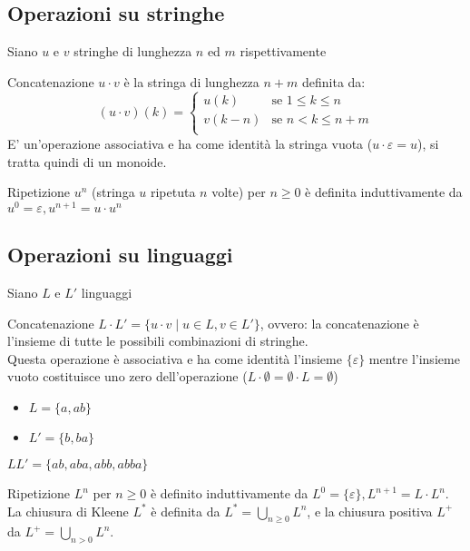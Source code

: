 \documentclass[12pt, a4paper]{report}
\newenvironment{example}[1][]{\begin{tcolorbox}[example, #1]}{\end{tcolorbox}}
\begin{document}
    \subsection{Operazioni su stringhe}
        Siano $u$ e $v$ stringhe di lunghezza $n$ ed $m$ rispettivamente
        \begin{definitionbox}{Concatenazione}{}
            $u\cdot v$ è la stringa di lunghezza $n+m$ definita da:
            $$
                (u\cdot v)(k)=\begin{cases}
                    u(k) & \text{se } 1\leq k\leq n\\
                    v(k-n) & \text{se } n<k\leq n+m\\
                \end{cases}
            $$
            E' un'operazione associativa e ha come identità la stringa vuota ($u\cdot\varepsilon=u$), si tratta quindi di un monoide.
        \end{definitionbox}
        \begin{definitionbox}{Ripetizione}{}
            $u^n$ (stringa $u$ ripetuta $n$ volte) per $n\geq 0$ è definita induttivamente da $u^0=\varepsilon,u^{n+1}=u\cdot u^n$
        \end{definitionbox}
    \subsection{Operazioni su linguaggi}
        Siano $L$ e $L'$ linguaggi
        \begin{definitionbox}{Concatenazione}{}
            $L\cdot L'=\{u\cdot v\mid u\in L,v\in L'\}$, ovvero: la concatenazione è l'insieme di tutte le possibili combinazioni di stringhe.\\
            Questa operazione è associativa e ha come identità l'insieme $\{\varepsilon\}$ mentre l'insieme vuoto costituisce uno zero dell'operazione ($L\cdot\emptyset= \emptyset\cdot L=\emptyset$)
        \end{definitionbox} 
        \begin{example}{}
            \begin{itemize}
                \item $L=\{a,ab\}$
                \item $L'=\{b,ba\}$
            \end{itemize}
            $LL'=\{ab,aba,abb,abba\}$
        \end{example} 
        \begin{definitionbox}{Ripetizione}{}
            $L^n$ per $n\geq 0$  è definito induttivamente da $L^0=\{\varepsilon\},L^{n+1}=L\cdot L^n$.\\
            La chiusura di Kleene $L^*$ è definita da $L^*=\bigcup_{n\geq 0}L^n$, e la chiusura positiva $L^+$  da $L^+=\bigcup_{n>0}L^n$.
        \end{definitionbox}  
\end{document}
